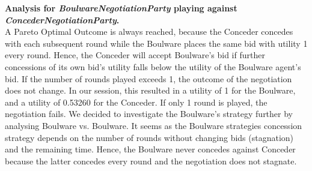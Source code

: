\documentclass[a4paper,11pt]{article}
\theoremstyle{mytheor}
\begin{document}
\textbf{Analysis for \emph{BoulwareNegotiationParty} playing against \emph{ConcederNegotiationParty}.}\\
A Pareto Optimal Outcome is always reached, because the Conceder concedes with each subsequent round while the Boulware places the same bid with utility 1 every round. Hence, the Conceder will accept Boulware's bid if further concessions of its own bid's utility falls below the utility of the Boulware agent's bid. If the number of rounds played exceeds 1, the outcome of the negotiation does not change. In our session, this resulted in a utility of 1 for the Boulware, and a utility of 0.53260 for the Conceder. If only 1 round is played, the negotiation fails. We decided to investigate the Boulware's strategy further by analysing Boulware vs. Boulware. It seems as the Boulware strategies concession strategy depends on the number of rounds without changing bids (stagnation) and the remaining time. Hence, the Boulware never concedes against Conceder because the latter concedes every round and the negotiation does not stagnate. 




\renewcommand\refname{\scriptsize References\vspace*{-4mm}}

{\footnotesize}
\end{document}
